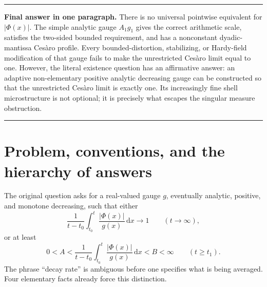 \documentclass[11pt,oneside]{article}
\theoremstyle{definition}
\theoremstyle{remark}
\newcommand{\dd}{\,\mathrm d}
\newenvironment{boxedremark}{%
  \par\smallskip\noindent\begin{center}\begin{minipage}{0.94\textwidth}%
  \color{black}\hrule\vspace{0.6em}\small
}{%
  \vspace{0.6em}\hrule\end{minipage}\end{center}\smallskip
}
\begin{document}
\begin{abstract}
We also give the complete exponent spectrum
\(\kappa_0=3.15149612947\ldots\) (typical),
\(\kappa_1=2.74807001487\ldots\) (arithmetic),
\(\kappa_2=\log_2(2\pi)=2.65149612947\ldots\) (RMS), and
\(\kappa_\infty=2.35901487911\ldots\) (uniform coarse envelope), prove the
sharp Lambert-\(W\) asymptotic for the largest peak in a dyadic annulus, and
rederive the central limit theorem and law of the iterated logarithm.  The exact
variance is \(\pi^2/4\), not \(\pi^2/2\); hence the published LIL constant in
the cited lacunary-product paper is too large by \(\sqrt2\).
\end{abstract}

\begin{boxedremark}
\textbf{Final answer in one paragraph.}
There is no universal pointwise equivalent for \(|\Phi(x)|\).  The simple
analytic gauge \(A_1g_1\) gives the correct arithmetic scale, satisfies the
two-sided bounded requirement, and has a nonconstant dyadic-mantissa Ces\`aro
profile.  Every bounded-distortion, stabilizing, or Hardy-field modification of
that gauge fails to make the unrestricted Ces\`aro limit equal to one.  However,
the literal existence question has an affirmative answer: an adaptive
non-elementary positive analytic decreasing gauge can be constructed so that
the unrestricted Ces\`aro limit is exactly one.  Its increasingly fine shell
microstructure is not optional; it is precisely what escapes the singular
measure obstruction.
\end{boxedremark}

\tableofcontents
\newpage

\section{Problem, conventions, and the hierarchy of answers}
\label{sec:introduction}

The original question asks for a real-valued gauge \(g\), eventually analytic,
positive, and monotone decreasing, such that either
\begin{equation}
 \frac1{t-t_0}\int_{t_0}^t\frac{|\Phi(x)|}{g(x)}\dd x\longrightarrow1
 \qquad(t\to\infty),
 \label{eq:Q2}
\end{equation}
or at least
\begin{equation}
 0<A<\frac1{t-t_0}\int_{t_0}^t\frac{|\Phi(x)|}{g(x)}\dd x<B<\infty
 \qquad(t\ge t_1).
 \label{eq:Q3}
\end{equation}
The phrase ``decay rate'' is ambiguous before one specifies what is being
averaged.  Four elementary facts already force this distinction.
\end{document}
